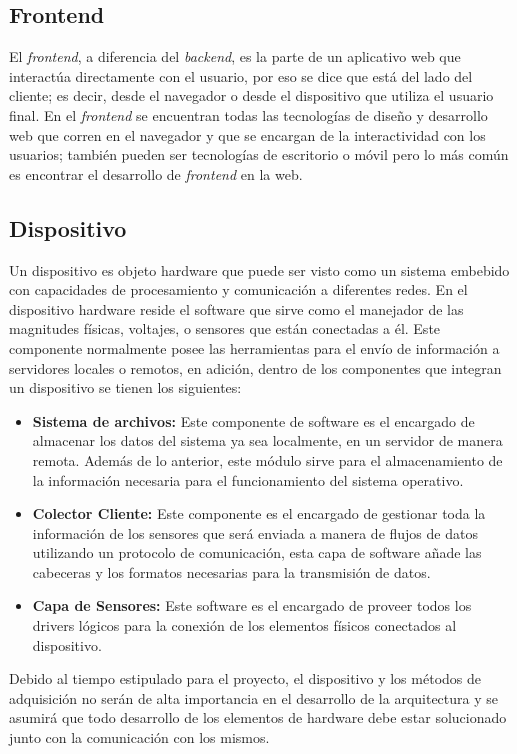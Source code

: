 \subsection{Frontend}

El \textit{frontend}, a diferencia del \textit{backend}, es la parte de un aplicativo web que interactúa directamente con el usuario, por eso se dice que está del lado del cliente; es decir, desde el navegador o desde el dispositivo que utiliza el usuario final. En el \textit{frontend} se encuentran todas las tecnologías de diseño y desarrollo web que corren en el navegador y que se encargan de la interactividad con los usuarios; también pueden ser tecnologías de escritorio o móvil pero lo más común es encontrar el desarrollo de \textit{frontend} en la web.

\subsection{Dispositivo}
Un dispositivo es objeto hardware que puede ser visto como un sistema embebido con capacidades de procesamiento y comunicación a diferentes redes. En el dispositivo hardware reside el software que sirve como el manejador de las magnitudes físicas, voltajes, o sensores que están conectadas a él. Este componente normalmente posee las herramientas para el envío de información a servidores locales o remotos, en adición, dentro de los componentes que integran un dispositivo se tienen los siguientes:

\begin{itemize}
	\item \textbf{Sistema de archivos:} Este componente de software es el encargado de almacenar los datos del sistema ya sea localmente, en un servidor de manera remota. Además de lo anterior, este módulo sirve para el almacenamiento de la información necesaria para el funcionamiento del sistema operativo. 
	
	\item \textbf{Colector Cliente:} Este componente es el encargado de gestionar toda la información de los sensores que será enviada a manera de flujos de datos utilizando un protocolo de comunicación, esta capa de software añade las cabeceras y los formatos necesarias para la transmisión de datos.
	\item \textbf{Capa de Sensores:} Este software es el encargado de proveer todos los drivers lógicos para la conexión de los elementos físicos conectados al dispositivo.
\end{itemize}
Debido al tiempo estipulado para el proyecto, el dispositivo y los métodos de adquisición no serán de alta importancia en el desarrollo de la arquitectura y se asumirá que todo desarrollo de los elementos de hardware debe estar solucionado junto con la comunicación con los mismos.



